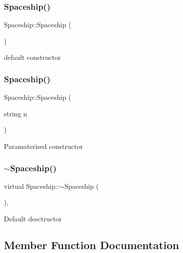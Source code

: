\subsubsection{\texorpdfstring{Spaceship()}{Spaceship()}\hspace{0.1cm}{\footnotesize\ttfamily [1/2]}}
{\footnotesize\ttfamily Spaceship\+::\+Spaceship (\begin{DoxyParamCaption}{ }\end{DoxyParamCaption})\hspace{0.3cm}{\ttfamily [inline]}}

default constructor \mbox{\label{classSpaceship_a27d48c8aff00407fd50f18522aa5164c}} 
\subsubsection{\texorpdfstring{Spaceship()}{Spaceship()}\hspace{0.1cm}{\footnotesize\ttfamily [2/2]}}
{\footnotesize\ttfamily Spaceship\+::\+Spaceship (\begin{DoxyParamCaption}\item[{string}]{n }\end{DoxyParamCaption})\hspace{0.3cm}{\ttfamily [inline]}}

Paramaterised constructor \mbox{\label{classSpaceship_aaf51352795ea2382e2aaea4b9a058804}} 
\subsubsection{\texorpdfstring{$\sim$\+Spaceship()}{~Spaceship()}}
{\footnotesize\ttfamily virtual Spaceship\+::$\sim$\+Spaceship (\begin{DoxyParamCaption}{ }\end{DoxyParamCaption})\hspace{0.3cm}{\ttfamily [inline]}, {\ttfamily [virtual]}}

Default desctructor 

\subsection{Member Function Documentation}
\mbox{\label{classSpaceship_ac1b4673a691cd100708ddea08cd9f192}} 
